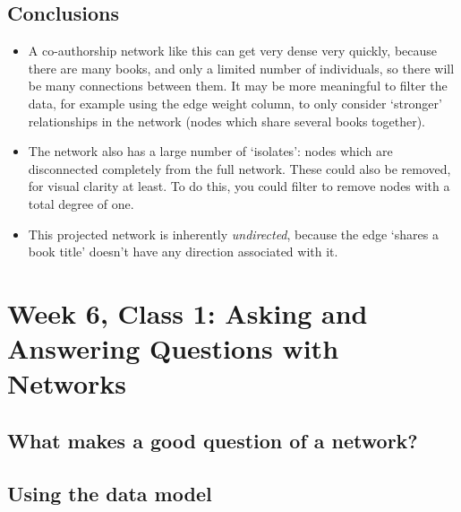 \documentclass[
]{book}
\begin{document}
\hypertarget{conclusions-3}{%
\section{Conclusions}\label{conclusions-3}}

\begin{itemize}
\item
  A co-authorship network like this can get very dense very quickly, because there are many books, and only a limited number of individuals, so there will be many connections between them. It may be more meaningful to filter the data, for example using the edge weight column, to only consider `stronger' relationships in the network (nodes which share several books together).
\item
  The network also has a large number of `isolates': nodes which are disconnected completely from the full network. These could also be removed, for visual clarity at least. To do this, you could filter to remove nodes with a total degree of one.
\item
  This projected network is inherently \emph{undirected}, because the edge `shares a book title' doesn't have any direction associated with it.
\end{itemize}

\hypertarget{section}{%
\section{}\label{section}}

\hypertarget{week-6-class-1-asking-and-answering-questions-with-networks}{%
\chapter{Week 6, Class 1: Asking and Answering Questions with Networks}\label{week-6-class-1-asking-and-answering-questions-with-networks}}

\hypertarget{what-makes-a-good-question-of-a-network}{%
\section{What makes a good question of a network?}\label{what-makes-a-good-question-of-a-network}}

\hypertarget{using-the-data-model}{%
\section{Using the data model}\label{using-the-data-model}}
\end{document}
